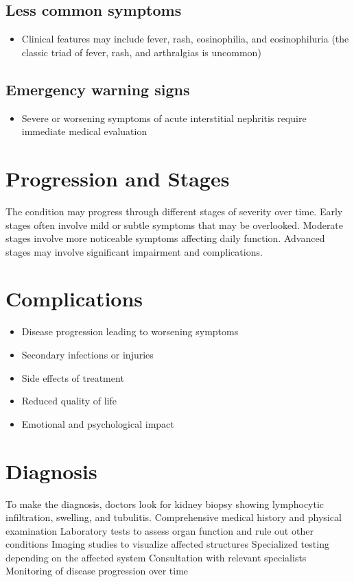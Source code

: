 \subsection{Less common symptoms}
\begin{itemize}[noitemsep]
  \item Clinical features may include fever, rash, eosinophilia, and eosinophiluria (the classic triad of fever, rash, and arthralgias is uncommon)
\end{itemize}

\subsection{Emergency warning signs}
\begin{itemize}[noitemsep]
  \item Severe or worsening symptoms of acute interstitial nephritis require immediate medical evaluation
\end{itemize}
\section{Progression and Stages}
The condition may progress through different stages of severity over time. Early stages often involve mild or subtle symptoms that may be overlooked. Moderate stages involve more noticeable symptoms affecting daily function. Advanced stages may involve significant impairment and complications.
\section{Complications}
\begin{itemize}[noitemsep]
  \item Disease progression leading to worsening symptoms
  \item Secondary infections or injuries
  \item Side effects of treatment
  \item Reduced quality of life
  \item Emotional and psychological impact
\end{itemize}
\section{Diagnosis}
To make the diagnosis, doctors look for kidney biopsy showing lymphocytic infiltration, swelling, and tubulitis. Comprehensive medical history and physical examination Laboratory tests to assess organ function and rule out other conditions Imaging studies to visualize affected structures Specialized testing depending on the affected system Consultation with relevant specialists Monitoring of disease progression over time

